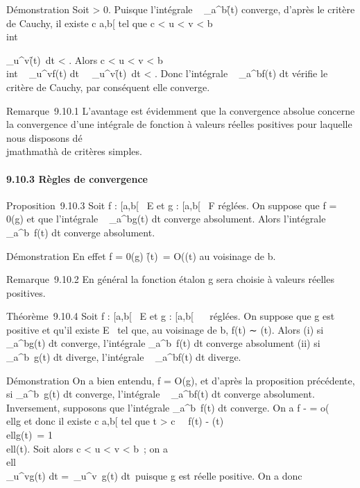 \documentclass[]{article}
\begin{document}
Démonstration Soit \epsilon \textgreater{} 0. Puisque l'intégrale
\int ~
_a^b\f(t)\dt
converge, d'après le critère de Cauchy, il existe c \in {[}a,b{[} tel que
c \textless{} u \textless{} v \textless{} b \rigtharrow~\\int

_u^v\f(t)\
dt \textless{} \epsilon. Alors c \textless{} u \textless{} v \textless{} b
\rigtharrow~\\int ~
_u^vf(t) dt\
\leq\int ~
_u^v\f(t)\
dt \textless{} \epsilon. Donc l'intégrale \int ~
_a^bf(t) dt vérifie le critère de Cauchy, par conséquent
elle converge.

Remarque~9.10.1 L'avantage est évidemment que la convergence absolue
concerne la convergence d'une intégrale de fonction à valeurs réelles
positives pour laquelle nous disposons dé\\jmathmathà de critères simples.

\paragraph{9.10.3 Règles de convergence}

Proposition~9.10.3 Soit f : {[}a,b{[}\rightarrow~ E et g : {[}a,b{[}\rightarrow~ F réglées. On
suppose que f = 0(g) et que l'intégrale \int ~
_a^bg(t) dt converge absolument. Alors l'intégrale
\int  _a^b~f(t) dt converge
absolument.

Démonstration En effet f = 0(g) \Leftrightarrow
\f(t)\ =
O(\g(t)\) au voisinage
de b.

Remarque~9.10.2 En général la fonction étalon g sera choisie à valeurs
réelles positives.

Théorème~9.10.4 Soit f : {[}a,b{[}\rightarrow~ E et g : {[}a,b{[}\rightarrow~ ~ réglées. On
suppose que g est positive et qu'il existe \ell \in E
\diagdown\0\ tel que, au voisinage de b, f(t)
∼ \ellg(t). Alors (i) si \int ~
_a^bg(t) dt converge, l'intégrale
\int  _a^b~f(t) dt converge
absolument (ii) si \int  _a^b~g(t)
dt diverge, l'intégrale \int ~
_a^bf(t) dt diverge.

Démonstration On a bien entendu, f = O(g), et d'après la proposition
précédente, si \int  _a^b~g(t) dt
converge, l'intégrale \int ~
_a^bf(t) dt converge absolument. Inversement, supposons
que l'intégrale \int  _a^b~f(t) dt
converge. On a f - \ellg =
o(\\ellg\) et donc il
existe c \in {[}a,b{[} tel que t \textgreater{} c
\rigtharrow~\ f(t) - \ellg(t)\ 
\\ellg(t)\ = 1
\over 2
\\ell\g(t). Soit alors c
\textless{} u \textless{} v \textless{} b~; on a
\\ell\\\int
 _u^vg(t) dt =\
\ell\int  _u^v~g(t)
dt\ puisque g est réelle positive. On a donc
\end{document}
